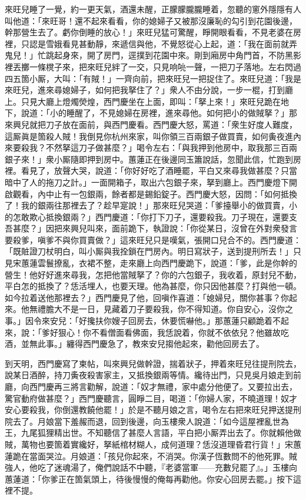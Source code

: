 來旺兒睡了一覺，約一更天氣，酒還未醒，正朦朦朧朧睡着，忽聽的窻外隱隱有人叫他道：「來旺哥！還不起來看看，你的媳婦子又被那沒廉恥的勾引到花園後邊，幹那營生去了。虧你倒睡的放心！」{}來旺兒猛可驚醒，睜開眼看看，不見老婆在房裡，只認是雪娥看見甚動靜，來遞信與他，不覺怒從心上起，道：「我在面前就弄鬼兒！」忙跳起身來，開了房門，逕撲到花園中來。剛到廂房中角門首，不防黑影裡丟擲一條櫈子來，把來旺兒絆了一交，只見响喨一聲，一把刀子落地。左右閃過四五箇小厮，大叫：「有賊！」一齊向前，把來旺兒一把捉住了。來旺兒道：「我是來旺兒，進來尋媳婦子，如何把我拏住了？」衆人不由分說，一步一棍，打到廳上。只見大廳上燈燭熒煌，西門慶坐在上面，即叫：「拏上來！」來旺兒跪在地下，說道：「小的睡醒了，不見媳婦在房裡，進來尋他。如何把小的做賊拏？」那來興兒就把刀子放在面前，與西門慶看。西門慶大怒，罵道：「衆生好度人難度，這厮眞是箇殺人賊！我倒見你杭州來家，叫你領三百兩銀子做買賣，如何夤夜進內來要殺我？不然拏這刀子做甚麼？」喝令左右：「與我押到他房中，取我那三百兩銀子來！」衆小厮隨即押到房中。蕙蓮正在後邊同玉簫說話，忽聞此信，忙跑到房裡。看見了，放聲大哭，說道：「你好好吃了酒睡罷，平白又來尋我做甚麼？只當暗中了人的拖刀之計。」一面開箱子，取出六包銀子來，拏到廳上。西門慶燈下開啟觀看，內中止有一包銀兩，餘者都是錫鉛錠子。西門慶大怒，因問：「如何抵換了！我的銀兩往那裡去了？趁早寔說！」那來旺兒哭道：「爹擡舉小的做買賣，小的怎敢欺心抵換銀兩？」西門慶道：「你打下刀子，還要殺我。刀子現在，還要支吾甚麼？」因把來興兒叫來，面前跪下，執證說：「你從某日，沒曾在外對衆發言要殺爹，嗔爹不與你買賣做？」這來旺兒只是嘆氣，張開口兒合不的。西門慶道：「既賍證刀杖明白，叫小厮與我拴鎖在門房內。明日寫狀子，送到提刑所去！」只見宋蕙蓮雲鬟撩亂，衣裙不整，走來廳上向西門慶跪下，說道：「爹，此是你幹的營生！他好好進來尋我，怎把他當賊拏了？你的六包銀子，我收着，原封兒不動，平白怎的抵換了？恁活埋人，也要天理。他為甚麼，你只因他甚麼？{}打與他一頓。如今拉着送他那裡去？」西門慶見了他，回嗔作喜道：「媳婦兒，關你甚事？你起來。他無禮膽大不是一日，見藏着刀子要殺我，你不得知道。你自安心，沒你之事。」因令來安兒：「好攙扶你嫂子回房去，休要慌嚇他。」{}那蕙蓮只顧跪着不起來，說：「爹好狠心！你不看僧面看佛面，我恁說着，你就不依依兒？{}他雖故吃酒，並無此事。」纏得西門慶急了，教來安兒搊他起來，勸他回房去了。

到天明，西門慶寫了柬帖，叫來興兒做幹證，揣着狀子，押着來旺兒往提刑院去，說某日酒醉，持刀夤夜殺害家主，又抵換銀兩等情。纔待出門，只見吳月娘走到前廳，向西門慶再三將言勸解，說道：「奴才無禮，家中處分他便了。又要拉出去，驚官動府做甚麼？」西門慶聽言，圓睜二目，喝道：「你婦人家，不曉道理！奴才安心要殺我，你倒還教饒他罷！」{}於是不聽月娘之言，喝令左右把來旺兒押送提刑院去了。月娘當下羞赧而退，回到後邊，向玉樓衆人說道：「如今這屋裡亂世為王，九尾狐狸精出世。不知聽信了甚麼人言語，平白把小厮弄出去了。你就賴他做賊，萬物也要箇着實纔好，拏紙棺材糊人，成何道理？恁沒道理昏君行貨！」宋蕙蓮跪在當面哭泣。月娘道：「孩兒你起來，不消哭。你漢子恆數問不的他死罪。賊強人，他吃了迷魂湯了，俺們說話不中聽，『老婆當軍——充數兒罷了』。」玉樓向蕙蓮道：「你爹正在箇氣頭上，待後慢慢的俺每再勸他。你安心回房去罷。」按下這裡不提。

